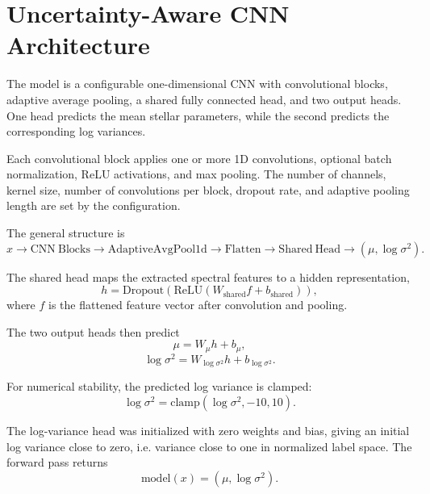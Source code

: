 \section{Uncertainty-Aware CNN Architecture}
\label{app:model_architecture}

The model is a configurable one-dimensional CNN with convolutional blocks, adaptive average pooling, a shared fully connected head, and two output heads. One head predicts the mean stellar parameters, while the second predicts the corresponding log variances.

Each convolutional block applies one or more 1D convolutions, optional batch normalization, ReLU activations, and max pooling. The number of channels, kernel size, number of convolutions per block, dropout rate, and adaptive pooling length are set by the configuration.

The general structure is
\begin{equation*}
    x \rightarrow
    \mathrm{CNN\ Blocks} \rightarrow
    \mathrm{AdaptiveAvgPool1d} \rightarrow
    \mathrm{Flatten} \rightarrow
    \mathrm{Shared\ Head} \rightarrow
    (\mu, \log \sigma^2).
\end{equation*}

The shared head maps the extracted spectral features to a hidden representation,
\begin{equation*}
    h = \mathrm{Dropout}\left(\mathrm{ReLU}\left(W_{\mathrm{shared}} f + b_{\mathrm{shared}}\right)\right),
\end{equation*}
where $f$ is the flattened feature vector after convolution and pooling.

The two output heads then predict
\begin{equation*}
    \mu = W_{\mu}h + b_{\mu},
\end{equation*}
\begin{equation*}
    \log \sigma^2 = W_{\log \sigma^2}h + b_{\log \sigma^2}.
\end{equation*}

For numerical stability, the predicted log variance is clamped:
\begin{equation*}
    \log \sigma^2 = \mathrm{clamp} \left( \log \sigma^2, -10, 10 \right).
\end{equation*}

The log-variance head was initialized with zero weights and bias, giving an initial log variance close to zero, i.e. variance close to one in normalized label space. The forward pass returns
\begin{equation*}
    \mathrm{model}(x) = \left(\mu, \log \sigma^2\right).
\end{equation*}


